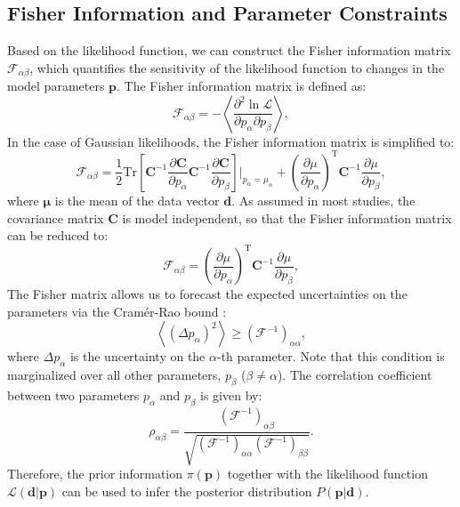 \subsection{Fisher Information and Parameter Constraints}
Based on the likelihood function, we can construct the Fisher information matrix $\mathcal{F}_{\alpha\beta}$, which quantifies the sensitivity of the likelihood function to changes in the model parameters $\mathbf{p}$. The Fisher information matrix is defined as:
\begin{equation}
    \mathcal{F}_{\alpha\beta} = -\left\langle \frac{\partial^2 \ln \mathcal{L}}{\partial p_\alpha \partial p_\beta} \right\rangle,
\end{equation}
In the case of Gaussian likelihoods, the Fisher information matrix is simplified to:
\begin{equation}
    \mathcal{F}_{\alpha\beta} = \frac{1}{2} \mathrm{Tr} \left[ \mathbf{C}^{-1} \frac{\partial \mathbf{C}}{\partial p_\alpha} \mathbf{C}^{-1} \frac{\partial \mathbf{C}}{\partial p_\beta} \right]\Bigg|_{p_\alpha = \mu_\alpha} + \left(\frac{\partial \mu}{\partial p_\alpha}\right)^{\mathrm{T}} \mathbf{C}^{-1} \frac{\partial \mu}{\partial p_\beta},
\end{equation}
where $\mathbf{\mu}$ is the mean of the data vector $\mathbf{d}$. 
As assumed in most studies, the covariance matrix $\mathbf{C}$ is model independent, so that the Fisher information matrix can be reduced to:
\begin{equation}
    \mathcal{F}_{\alpha\beta} = \left(\frac{\partial \mu}{\partial p_\alpha}\right)^{\mathrm{T}} \mathbf{C}^{-1} \frac{\partial \mu}{\partial p_\beta},
\end{equation}
The Fisher matrix allows us to forecast the expected uncertainties on the parameters via the Cramér-Rao bound \citep{rao1952advanced}:
\begin{equation}
    \left\langle (\Delta p_\alpha)^2 \right\rangle \geq (\mathcal{F}^{-1})_{\alpha\alpha},
\end{equation}
where $\Delta p_\alpha$ is the uncertainty on the $\alpha$-th parameter. Note that this condition is marginalized over all other parameters, $p_\beta$ ($\beta \neq \alpha$). The correlation coefficient between two parameters $p_\alpha$ and $p_\beta$ is given by:
\begin{equation}
    \rho_{\alpha\beta} = \frac{(\mathcal{F}^{-1})_{\alpha\beta}}{\sqrt{(\mathcal{F}^{-1})_{\alpha\alpha} (\mathcal{F}^{-1})_{\beta\beta}}}.
\end{equation}
Therefore, the prior information $\pi(\mathbf{p})$ together with the likelihood function $\mathcal{L}(\mathbf{d} | \mathbf{p})$ can be used to infer the posterior distribution $P(\mathbf{p} | \mathbf{d})$.

